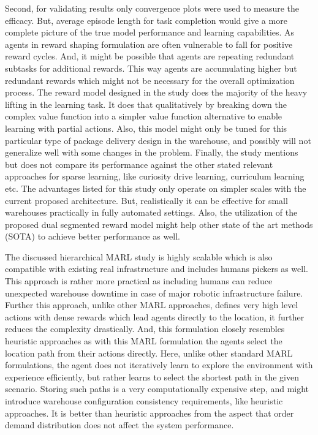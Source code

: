 \documentclass{article}
\begin{document}
Second, for validating results only convergence plots were used to measure the efficacy.
But, average episode length for task completion would give a more complete picture of the true model performance and learning capabilities.
As agents in reward shaping formulation are often vulnerable to fall for positive reward cycles.
And, it might be possible that agents are repeating redundant subtasks for additional rewards.
This way agents are accumulating higher but redundant rewards which might not be necessary for the overall optimization process.
The reward model designed in the study does the majority of the heavy lifting in the learning task.
It does that qualitatively by breaking down the complex value function into a simpler value function alternative to enable learning with partial actions.
Also, this model might only be tuned for this particular type of package delivery design in the warehouse, and possibly will not generalize well with some changes in the problem.
Finally, the study mentions but does not compare its performance against the other stated relevant approaches for sparse learning, like curiosity drive learning, curriculum learning etc.
The advantages listed for this study only operate on simpler scales with the current proposed architecture.
But, realistically it can be effective for small warehouses practically in fully automated settings.
Also, the utilization of the proposed dual segmented reward model might help other state of the art methods (SOTA) to achieve better performance as well.


The discussed hierarchical MARL study is highly scalable which is also compatible with existing real infrastructure and includes humans pickers as well.
This approach is rather more practical as including humans can reduce unexpected warehouse downtime in case of major robotic infrastructure failure.
Further this approach, unlike other MARL approaches, defines very high level actions with dense rewards which lead agents directly to the location, it further reduces the complexity drastically.
And, this formulation closely resembles heuristic approaches as with this MARL formulation the agents select the location path from their actions directly.
Here, unlike other standard MARL formulations, the agent does not iteratively learn to explore the environment with experience efficiently, but rather learns to select the shortest path in the given scenario.
Storing such paths is a very computationally expensive step, and might introduce warehouse configuration consistency requirements, like heuristic approaches.
It is better than heuristic approaches from the aspect that order demand distribution does not affect the system performance.
\end{document}
